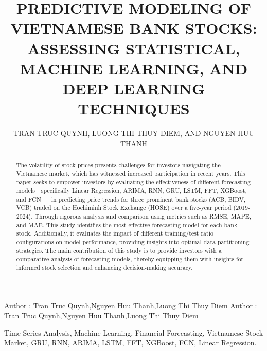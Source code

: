\documentclass{ieeeojies}
\begin{document}
\title{PREDICTIVE MODELING OF VIETNAMESE BANK STOCKS: ASSESSING STATISTICAL, MACHINE LEARNING, AND DEEP LEARNING TECHNIQUES}

\author{\uppercase{Tran Truc Quynh},
\uppercase{Luong Thi Thuy Diem, and Nguyen Huu Thanh}}

\address[1]{Faculty of Information Systems, University of Information Technology, (e-mail: 21522539@gm.uit.edu.vn)}
\address[2]{Faculty of Information Systems, University of Information Technology, (e-mail: 21521953@gm.uit.edu.vn)}
\address[3]{Faculty of Information Systems, University of Information Technology, (e-mail: 21522599@gm.uit.edu.vn)}

\markboth
{Author \headeretal: Tran Truc Quynh,Nguyen Huu Thanh,Luong Thi Thuy Diem}
{Author \headeretal: Tran Truc Quynh,Nguyen Huu Thanh,Luong Thi Thuy Diem}

\begin{abstract}
The volatility of stock prices presents challenges for investors navigating the Vietnamese market, which has witnessed increased participation in recent years. This paper seeks to empower investors by evaluating the effectiveness of different forecasting models—specifically Linear Regression, ARIMA, RNN, GRU, LSTM, FFT, XGBoost, and FCN — in predicting price trends for three prominent bank stocks (ACB, BIDV, VCB) traded on the Hochiminh Stock Exchange (HOSE) over a five-year period (2019-2024). Through rigorous analysis and comparison using metrics such as RMSE, MAPE, and MAE. This study identifies the most effective forecasting model for each bank stock. Additionally, it evaluates the impact of different training/test ratio configurations on model performance, providing insights into optimal data partitioning strategies. The main contribution of this study is to provide investors with a comparative analysis of forecasting models, thereby equipping them with insights for informed stock selection and enhancing decision-making accuracy.

\end{abstract}

\begin{keywords}
Time Series Analysis, Machine Learning, Financial Forecasting, Vietnamese Stock Market, GRU, RNN, ARIMA, LSTM, FFT, XGBoost, FCN, Linear Regression.
\end{keywords}

\titlepgskip=-15pt

\maketitle
\end{document}
